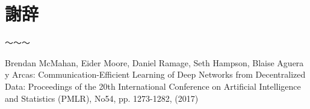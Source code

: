\documentclass[uplatex,dvipdfmx,a4paper,twocolumn,base=11pt,jbase=11pt,ja=standard]{bxjsarticle}  %
\begin{document}


\section*{謝辞}
〜〜〜



%
%

\begin{thebibliography}{1}
     Brendan McMahan, Eider Moore, Daniel Ramage, Seth Hampson, Blaise Aguera y Arcas: Communication-Efficient Learning of Deep Networks from Decentralized Data: Proceedings of the 20th International Conference on Artificial Intelligence and Statistics (PMLR), No54, pp. 1273-1282, (2017)
\end{thebibliography}
%
\end{document}
